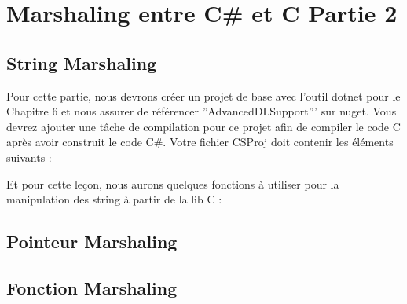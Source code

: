 \chapter{Marshaling entre C\# et C Partie 2}
\section{String Marshaling}
Pour cette partie, nous devrons créer un projet de base avec l'outil dotnet pour le Chapitre 6 et nous assurer de référencer ''AdvancedDLSupport''' sur nuget. Vous devrez ajouter une tâche de compilation pour ce projet afin de compiler le code C après avoir construit le code C\#. Votre fichier CSProj doit contenir les éléments suivants :

Et pour cette leçon, nous aurons quelques fonctions à utiliser pour la manipulation des string à partir de la lib C :



\section{Pointeur Marshaling}

\section{Fonction Marshaling}
